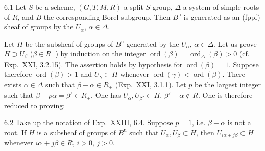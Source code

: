 \begin{lemma}{6.1}\label{XXIV.6.1}
Let $S$ be a scheme, $(G,T,M,R)$ a split $S$-group, $\Delta$ a system of simple roots of $R$, and $B$ the corresponding Borel subgroup. Then $B^{\mathrm u}$ is generated as an (fppf) sheaf of groups by the $U_\alpha$, $\alpha\in\Delta$.
\end{lemma}
Let $H$ be the subsheaf of groups of $B^{\mathrm u}$ generated by the $U_\alpha$, $\alpha\in\Delta$. Let us prove $H\supset U_\beta$ ($\beta\in R_+$) by induction on the integer $\operatorname{ord}(\beta)=\operatorname{ord}_\Delta(\beta)>0$ (cf. Exp.~XXI, 3.2.15). The assertion holds by hypothesis for $\operatorname{ord}(\beta)=1$. Suppose therefore $\operatorname{ord}(\beta)>1$ and $U_\gamma\subset H$ whenever $\operatorname{ord}(\gamma)<\operatorname{ord}(\beta)$. There exists $\alpha\in\Delta$ such that $\beta-\alpha\in R_+$ (Exp.~XXI, 3.1.1). Let $p$ be the largest integer such that $\beta-p\alpha=\beta'\in R_+$. One has $U_\alpha,U_{\beta'}\subset H$, $\beta'-\alpha\notin R$. One is therefore reduced to proving:
\begin{lemma}{6.2}\label{XXIV.6.2}
Take up the notation of Exp.~XXIII, 6.4. Suppose $p=1$, i.e. $\beta-\alpha$ is not a root. If $H$ is a subsheaf of groups of $B^{\mathrm u}$ such that $U_\alpha,U_\beta\subset H$, then $U_{i\alpha+j\beta}\subset H$ whenever $i\alpha+j\beta\in R$, $i>0$, $j>0$.
\end{lemma}
